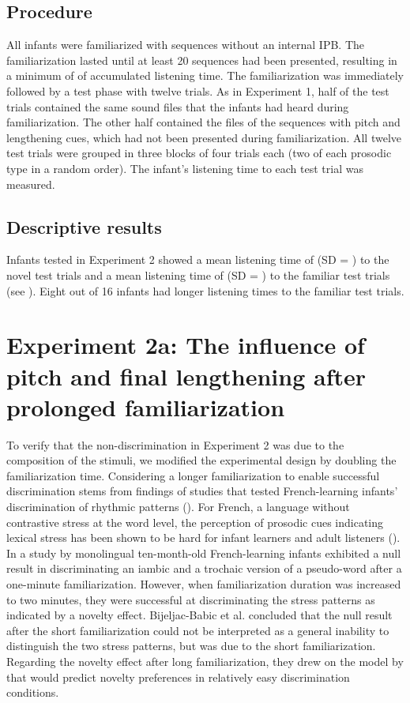\documentclass[output=paper]{langscibook}
\begin{document}
\subsection{Procedure}
All infants were familiarized with sequences without an internal IPB. The familiarization lasted until at least 20 sequences had been presented, resulting in a minimum of  of accumulated listening time.
The familiarization was immediately followed by a test phase with twelve trials. As in Experiment 1, half of the test trials contained the same sound files that the infants had heard during familiarization. The other half contained the files of the sequences with pitch and lengthening cues, which had not been presented during familiarization. All twelve test trials were grouped in three blocks of four trials each (two of each prosodic type in a random order). The infant’s listening time to each test trial was measured.

\subsection{Descriptive results}
Infants tested in Experiment 2 showed a mean listening time of  (SD = ) to the novel test trials and a mean listening time of  (SD = ) to the familiar test trials (see ). Eight out of 16 infants had longer listening times to the familiar test trials.


\section{Experiment 2a: The influence of pitch and final lengthening after prolonged familiarization}

To verify that the non-discrimination in Experiment 2 was due to the composition of the stimuli, we modified the experimental design by doubling the familiarization time. Considering a longer familiarization to enable successful discrimination stems from findings of studies that tested French-learning infants’ discrimination of rhythmic patterns (\citealt{Bijeljac-Babic2012, Hohle2009, Skoruppa2009}). For French, a language without contrastive stress at the word level, the perception of prosodic cues indicating lexical stress has been shown to be hard for infant learners and adult listeners (\citealt{Bhatara2013, Hohle2009}). In a study by \citet{Bijeljac-Babic2012} monolingual ten-month-old French-learning infants exhibited a null result in discriminating an iambic and a trochaic version of a pseudo-word after a one-minute familiarization. However, when familiarization duration was increased to two minutes, they were successful at discriminating the stress patterns as indicated by a novelty effect. Bijeljac-Babic et al. concluded that the null result after the short familiarization could not be interpreted as a general inability to distinguish the two stress patterns, but was due to the short familiarization. Regarding the novelty effect after long familiarization, they drew on the model by \citet{Hunter1988} that would predict novelty preferences in relatively easy discrimination conditions.
\end{document}
